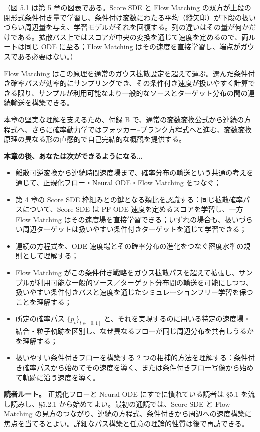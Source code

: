 （図 5.1 は第 5 章の図表である。Score SDE と Flow Matching の双方が上段の閉形式条件付き量で学習し、条件付け変数にわたる平均（縦矢印）が下段の扱いづらい周辺量を与え、学習モデルがそれを回復する。列の違いはその量が何かだけである。拡散パス上ではスコアが中央の変換を通じて速度を定めるので、両ルートは同じ ODE に至る；Flow Matching はその速度を直接学習し、端点がガウスである必要はない。）

Flow Matching はこの原理を通常のガウス拡散設定を超えて運ぶ。選んだ条件付き確率パスが効率的にサンプリングでき、その条件付き速度が扱いやすく計算できる限り、サンプルが利用可能なより一般的なソースとターゲット分布の間の連続輸送を構築できる。

本章の堅実な理解を支えるため、付録 B で、通常の変数変換公式から連続の方程式へ、さらに確率動力学ではフォッカー–プランク方程式へと進む、変数変換原理の異なる形の直感的で自己完結的な概観を提供する。

\textbf{本章の後、あなたは次ができるようになる…}

\begin{itemize}
\item 離散可逆変換から連続時間速度場まで、確率分布の輸送という共通の考えを通じて、正規化フロー・Neural ODE・Flow Matching をつなぐ；
\item 第 4 章の Score SDE 枠組みとの鍵となる類比を認識する：同じ拡散確率パスについて、Score SDE は PF-ODE 速度を定めるスコアを学習し、一方 Flow Matching はその速度場を直接学習できる；いずれの場合も、扱いづらい周辺ターゲットは扱いやすい条件付きターゲットを通じて学習できる；
\item 連続の方程式を、ODE 速度場とその確率分布の進化をつなぐ密度水準の規則として理解する；
\item Flow Matching がこの条件付き戦略をガウス拡散パスを超えて拡張し、サンプルが利用可能な一般的ソース／ターゲット分布間の輸送を可能にしつつ、扱いやすい条件付きパスと速度を通じたシミュレーションフリー学習を保つことを理解する；
\item 所定の確率パス $\{p_t\}_{t\in[0,1]}$ と、それを実現するのに用いる特定の速度場・結合・粒子軌跡を区別し、なぜ異なるフローが同じ周辺分布を共有しうるかを理解する；
\item 扱いやすい条件付きフローを構築する 2 つの相補的方法を理解する：条件付き確率パスから始めてその速度を導く、または条件付きフロー写像から始めて軌跡に沿う速度を導く。
\end{itemize}


\textbf{読者ルート。} 正規化フローと Neural ODE にすでに慣れている読者は §5.1 を流し読みし、§5.2.1 から始めてよい。最初の通読では、Score SDE と Flow Matching の見方のつながり、連続の方程式、条件付きから周辺への速度構築に焦点を当てるとよい。詳細なパス構築と任意の理論的性質は後で再訪できる。

